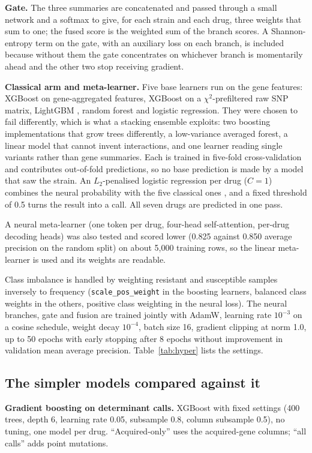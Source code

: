 \textbf{Gate.} The three summaries are concatenated and passed through a small network and a softmax
to give, for each strain and each drug, three weights that sum to one; the fused score is the
weighted sum of the branch scores. A Shannon-entropy term on the gate, with an auxiliary loss on
each branch, is included because without them the gate concentrates on whichever branch is
momentarily ahead and the other two stop receiving gradient.

\textbf{Classical arm and meta-learner.} Five base learners run on the gene features: XGBoost on
gene-aggregated features, XGBoost on a $\chi^2$-prefiltered raw SNP matrix, LightGBM
\cite{ke2017lightgbm}, random forest \cite{breiman2001rf} and logistic regression. They were chosen
to fail differently, which is what a stacking ensemble exploits: two boosting implementations that
grow trees differently, a low-variance averaged forest, a linear model that cannot invent
interactions, and one learner reading single variants rather than gene summaries. Each is trained
in five-fold cross-validation and contributes out-of-fold predictions, so no base prediction is
made by a model that saw the strain. An $L_2$-penalised logistic regression per drug ($C = 1$)
combines the neural probability with the five classical ones \cite{wolpert1992stacked}, and a fixed
threshold of 0.5 turns the result into a call. All seven drugs are predicted in one pass.

A neural meta-learner (one token per drug, four-head self-attention, per-drug decoding heads) was
also tested and scored lower (0.825 against 0.850 average precision on the random split) on about
5,000 training rows, so the linear meta-learner is used and its weights are readable.

Class imbalance is handled by weighting resistant and susceptible samples inversely to frequency
(\texttt{scale\_pos\_weight} in the boosting learners, balanced class weights in the others,
positive class weighting in the neural loss). The neural branches, gate and fusion are trained
jointly with AdamW, learning rate $10^{-3}$ on a cosine schedule, weight decay $10^{-4}$, batch
size 16, gradient clipping at norm 1.0, up to 50 epochs with early stopping after 8 epochs without
improvement in validation mean average precision. Table~\ref{tab:hyper} lists the settings.

\subsection*{The simpler models compared against it}
\textbf{Gradient boosting on determinant calls.} XGBoost \cite{chen2016xgboost} with fixed settings
(400 trees, depth 6, learning rate 0.05, subsample 0.8, column subsample 0.5), no tuning, one model
per drug. ``Acquired-only'' uses the acquired-gene columns; ``all calls'' adds point mutations.

